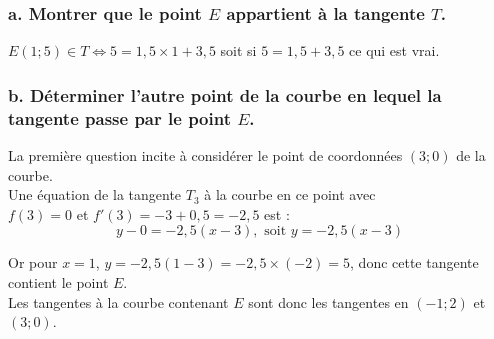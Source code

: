 	\subsubsection*{a. Montrer que le point $E$ appartient à la tangente $T$.}
	
$E(1; 5) \in T \Leftrightarrow 5 = 1,5 \times 1 + 3,5$ soit si $5 = 1,5 + 3,5$ ce qui est vrai.
	
	\subsubsection*{b. Déterminer l'autre point de la courbe en lequel la tangente passe par le point $E$.}
	
La première question incite à considérer le point de coordonnées $(3; 0)$ de la courbe.\\
Une équation de la tangente $T_3$ à la courbe en ce point avec \\
$f(3) = 0$ et $f'(3) = -3 + 0,5 = -2,5$ est :
\[	y - 0 = -2,5(x - 3), \text{ soit } y = -2,5(x - 3)
	\]
	
Or pour $x = 1$, $y = -2,5(1 - 3) = -2,5 \times (-2) = 5$, donc cette tangente contient le point $E$.\\
 Les tangentes à la courbe contenant $E$ sont donc les tangentes en $(-1; 2)$ et $(3; 0)$.
	
